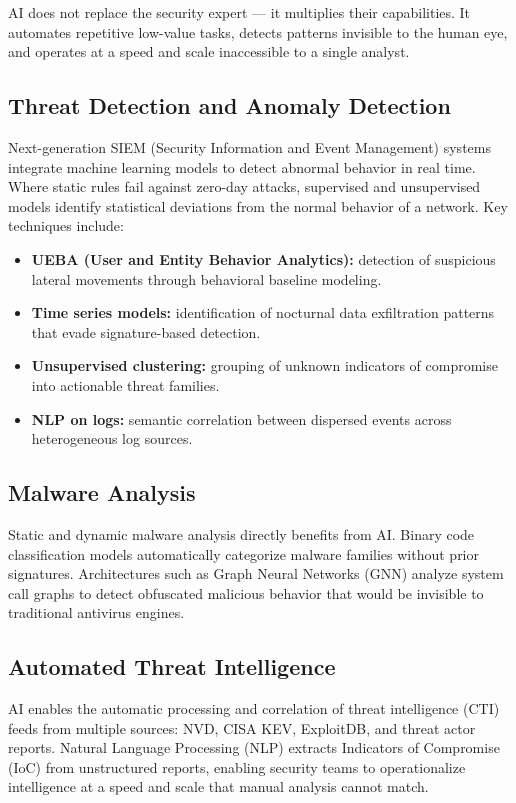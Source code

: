 \documentclass[12pt,a4paper]{report}
\begin{document}
AI does not replace the security expert --- it multiplies their capabilities. It
automates repetitive low-value tasks, detects patterns invisible to the human eye,
and operates at a speed and scale inaccessible to a single analyst.

\subsection{Threat Detection and Anomaly Detection}

Next-generation SIEM (Security Information and Event Management) systems integrate
machine learning models to detect abnormal behavior in real time. Where static rules
fail against zero-day attacks, supervised and unsupervised models identify statistical
deviations from the normal behavior of a network. Key techniques include:

\begin{itemize}
    \item \textbf{UEBA (User and Entity Behavior Analytics):} detection of suspicious
    lateral movements through behavioral baseline modeling.
    \item \textbf{Time series models:} identification of nocturnal data exfiltration
    patterns that evade signature-based detection.
    \item \textbf{Unsupervised clustering:} grouping of unknown indicators of
    compromise into actionable threat families.
    \item \textbf{NLP on logs:} semantic correlation between dispersed events across
    heterogeneous log sources.
\end{itemize}

\subsection{Malware Analysis}

Static and dynamic malware analysis directly benefits from AI. Binary code
classification models automatically categorize malware families without prior
signatures. Architectures such as Graph Neural Networks (GNN) analyze system call
graphs to detect obfuscated malicious behavior that would be invisible to
traditional antivirus engines.

\subsection{Automated Threat Intelligence}

AI enables the automatic processing and correlation of threat intelligence (CTI)
feeds from multiple sources: NVD, CISA KEV, ExploitDB, and threat actor reports.
Natural Language Processing (NLP) extracts Indicators of Compromise (IoC) from
unstructured reports, enabling security teams to operationalize intelligence at
a speed and scale that manual analysis cannot match.
\end{document}
